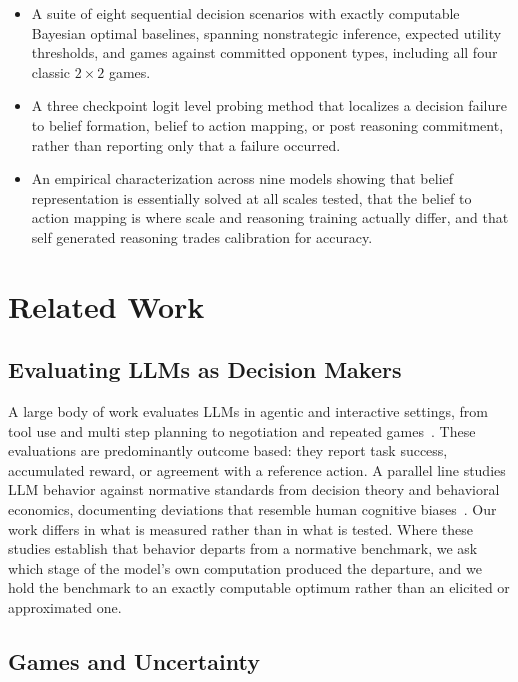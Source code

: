 \begin{itemize}
    \item A suite of eight sequential decision scenarios with exactly
    computable Bayesian optimal baselines, spanning nonstrategic inference,
    expected utility thresholds, and games against committed opponent types,
    including all four classic $2{\times}2$ games.

    \item A three checkpoint logit level probing method that localizes a
    decision failure to belief formation, belief to action mapping, or post
    reasoning commitment, rather than reporting only that a failure occurred.

    \item An empirical characterization across nine models showing that belief
    representation is essentially solved at all scales tested, that the belief
    to action mapping is where scale and reasoning training actually differ,
    and that self generated reasoning trades calibration for accuracy.
\end{itemize}


\section{Related Work}

\subsection{Evaluating LLMs as Decision Makers}

A large body of work evaluates LLMs in agentic and interactive settings, from
tool use and multi step planning to negotiation and repeated
games~\citep{VERIFY_react, VERIFY_llm_agents_survey, VERIFY_akata_repeated_games}.
These evaluations are predominantly outcome based: they report task success,
accumulated reward, or agreement with a reference action. A parallel line
studies LLM behavior against normative standards from decision theory and
behavioral economics, documenting deviations that resemble human cognitive
biases~\citep{VERIFY_llm_behavioral_econ}. Our work differs in what is measured
rather than in what is tested. Where these studies establish that behavior
departs from a normative benchmark, we ask which stage of the model's own
computation produced the departure, and we hold the benchmark to an exactly
computable optimum rather than an elicited or approximated one.

\subsection{Games and Uncertainty}

